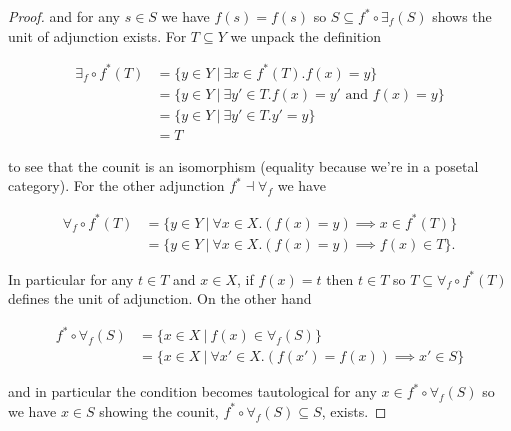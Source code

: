 \documentclass[11pt]{amsart}
\theoremstyle{plain}
\newtheorem{prob}[thm]{Problem}
\theoremstyle{definition}
\newcommand{\cC}{{\mathcal C}}
\newcommand{\cD}{{\mathcal D}}
\newcommand{\noi}{{\noindent}}
\begin{document}
\begin{proof}
\noi and for any $s \in S$ we have $f(s) = f(s)$ so $S \subseteq f^* \circ \exists_f(S)$ shows the unit of adjunction exists. For $T \subseteq Y$ we unpack the definition

\begin{align*}
\exists_f \circ f^* (T) 
&= \{ y \in Y \ | \ \exists x \in f^*(T) . f(x) = y \} \\
&= \{ y \in Y \ | \ \exists y' \in T . f(x) = y' \text{ and } f(x) = y \}  \\
&= \{ y \in Y \ | \ \exists y' \in T . y' = y \} \\
&= T  
\end{align*}

\noi to see that the counit is an isomorphism (equality because we're in a posetal category). For the other adjunction $f^* \dashv \forall_f$ we have 

\begin{align*}
\forall_f \circ f^* (T) 
&= \{ y \in Y \ | \ \forall x \in X. (f(x) = y) \implies x \in f^*(T) \}\\
&= \{ y \in Y \ | \ \forall x \in X. (f(x) = y) \implies f(x) \in T \}.
\end{align*}


\noi In particular for any $t \in T$ and $x \in X$, if $f(x) = t$ then $t \in T$ so $T \subseteq \forall_f \circ f^* (T) 
$ defines the unit of adjunction. On the other hand 

\begin{align*}
f^* \circ \forall_f(S)
&= \{ x \in X \ | \ f(x) \in \forall_f(S) \} \\
&= \{ x \in X \ | \ \forall x' \in X. (f(x') = f(x)) \implies x' \in S \}
\end{align*}

\noi and in particular the condition becomes tautological for any $x \in f^* \circ \forall_f(S)$ so we have $x \in S$ showing the counit, $f^* \circ \forall_f(S) \subseteq S$, exists. 
\end{proof}

\begin{comment}
\begin{prob}[Bonus]
Every equivalence of categories can be made into an adjoint equivalence. 
\end{prob}
\begin{proof}
Suppose $F : \cC \to \cD$ is an equivalence of categories. Then there exists a functor $G : \cD \to \cC$ and natural isomorphisms $1_\cC \cong G \circ F$ and $G \circ F \cong 1_\cD$. \medskip 

\noi We can modify one of the natural isomorphisms in order to satisfy the triangle identities. 

\end{proof}
\end{comment}
\end{document}
